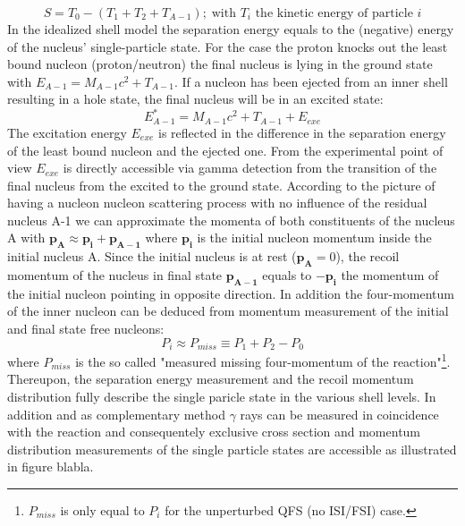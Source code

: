 \begin{equation}
S = T_0 -(T_1+T_2 +T_{A-1}); \; \text{with $T_i$ the kinetic energy of particle $i$} 
\label{eq:sep_e}
\end{equation}
In the idealized shell model the separation energy equals to the (negative) energy of the nucleus' single-particle state. For the case the proton knocks out the least bound nucleon (proton/neutron) the final nucleus is lying in the ground state with $E_{A-1} = M_{A-1}c^2  + T_{A-1}$.\newline
If a nucleon has been ejected from an inner shell resulting in a hole state, the final nucleus will be in an excited state:
\begin{equation}
E^{*}_{A-1} =  M_{A-1}c^2  +T_{A-1} + E_{exe}
\end{equation} 
The excitation energy $E_{exe}$ is reflected in the difference in the separation energy of the least bound nucleon and the ejected one. From the experimental point of view $E_{exe}$ is directly accessible via gamma detection from the transition of the final nucleus from the excited to the ground state.\newline
According to the picture of having a nucleon nucleon scattering process with no influence of the residual nucleus A-1 we can approximate the momenta of both constituents of the nucleus A with $\mathbf{p_A} \approx \mathbf{p_i} + \mathbf{p_{A-1}}$ where $\mathbf{p_i}$ is the initial nucleon momentum inside the initial nucleus A. Since the initial nucleus is at rest ($\mathbf{p_A} = 0$), the recoil momentum of the nucleus in final state $\mathbf{p_{A-1}}$ equals to $-\mathbf{p_i}$ the momentum of the initial nucleon pointing in opposite direction. \newline
In addition the four-momentum of the inner nucleon can be deduced from momentum measurement of the initial and final state free nucleons:
\begin{equation}\label{eq:miss_mom}
P_i \approx P_{miss} \equiv P_1 + P_2  - P_0
\end{equation}
where $P_{miss}$ is the so called "measured missing four-momentum of the reaction"\cite{patsyuk2021unperturbed}\footnote{$P_{miss}$ is only equal to $P_i$ for the unperturbed QFS (no ISI/FSI) case.}.
Thereupon, the separation energy measurement and the recoil momentum distribution fully describe the single paricle state in the various shell levels. 
In addition and as complementary method $\gamma$ rays can be measured in coincidence with the reaction and consequentely exclusive cross section and momentum distribution measurements of the single particle states are accessible as illustrated in figure blabla.\newline
